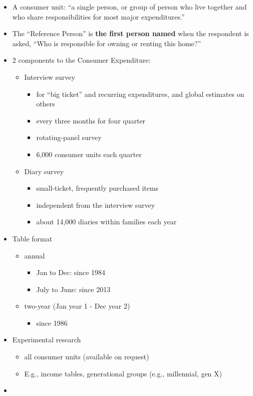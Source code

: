 \documentclass[
]{book}
\providecommand{\tightlist}{%
  \setlength{\itemsep}{0pt}\setlength{\parskip}{0pt}}
\begin{document}
\begin{itemize}
\item
  A consumer unit: ``a single person, or group of person who live together and who share responsibilities for most
  major expenditures.''
\item
  The ``Reference Person'' is \textbf{the first person named} when the respondent is asked, ``Who is responsible for owning or
  renting this home?''
\item
  2 components to the Consumer Expenditure:

  \begin{itemize}
  \item
    Interview survey

    \begin{itemize}
    \tightlist
    \item
      for ``big ticket'' and recurring expenditures, and global estimates on others
    \item
      every three months for four quarter
    \item
      rotating-panel survey
    \item
      6,000 consumer units each quarter
    \end{itemize}
  \item
    Diary survey

    \begin{itemize}
    \item
      small-ticket, frequently purchased items
    \item
      independent from the interview survey
    \item
      about 14,000 diaries within families each year
    \end{itemize}
  \end{itemize}
\item
  Table format

  \begin{itemize}
  \item
    annual

    \begin{itemize}
    \item
      Jan to Dec: since 1984
    \item
      July to June: since 2013
    \end{itemize}
  \item
    two-year (Jan year 1 - Dec year 2)

    \begin{itemize}
    \tightlist
    \item
      since 1986
    \end{itemize}
  \end{itemize}
\item
  Experimental research

  \begin{itemize}
  \item
    all consumer units (available on request)
  \item
    E.g., income tables, generational groups (e.g., millennial, gen X)
  \end{itemize}
\item
\end{itemize}
\end{document}
